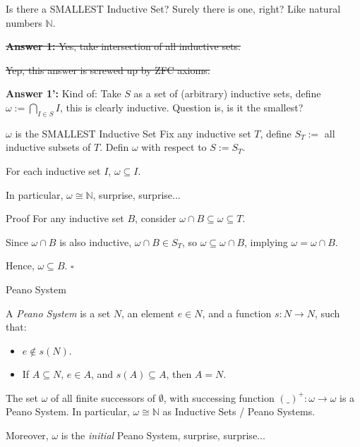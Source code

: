 \documentclass[10pt]{beamer}
\begin{document}
\begin{frame}{Is there a SMALLEST Inductive Set?}
    Surely there is one, right? Like natural numbers $\mathbb{N}$.

    \hfil

    \sout{\textbf{Answer 1:} Yes, take intersection of all inductive sets.}

    \hfil \sout{Yep, this answer is screwed up by ZFC axioms.}

    \hfil

    \textbf{Answer 1':} Kind of: Take $S$ as a set of (arbitrary) inductive sets, define $\omega:= \bigcap_{I\in S}I$, this is clearly inductive. Question is, is it the smallest?
\end{frame}

\begin{frame}{$\omega$ is the SMALLEST Inductive Set}
    Fix any inductive set $T$, define $S_T:=$ all inductive subsets of $T$. Defin $\omega$ with respect to $S:= S_T$.

    \hfil

    \begin{theorem}
        For each inductive set $I$, $\omega\subseteq I$.
    \end{theorem}

    \hfil

    In particular, $\omega\cong \mathbb{N}$, surprise, surprise...
\end{frame}

\begin{frame}{Proof}
    For any inductive set $B$, consider $\omega\cap B\subseteq \omega\subseteq T$.

    Since $\omega\cap B$ is also inductive, $\omega\cap B\in S_T$, so $\omega\subseteq \omega\cap B$, implying $\omega=\omega\cap B$. 

    Hence, $\omega\subseteq B$. $\square$
\end{frame}

\begin{frame}{Peano System}
    \begin{definition}
        A \emph{Peano System} is a set $N$, an element $e\in N$, and a function $s:N\rightarrow N$, such that:
        \begin{itemize}
            \item $e\notin s(N)$.
            \item If $A\subseteq N$, $e\in A$, and $s(A)\subseteq A$, then $A=N$.
        \end{itemize}
    \end{definition}

    \hfil

    \begin{example}
        The set $\omega$ of all finite successors of $\emptyset$, with successing function $(\_)^+:\omega\rightarrow\omega$ is a Peano System. In particular, $\omega\cong \mathbb{N}$ as Inductive Sets / Peano Systems.

        Moreover, $\omega$ is the \emph{initial} Peano System, surprise, surprise...
    \end{example}
\end{frame}
\end{document}
